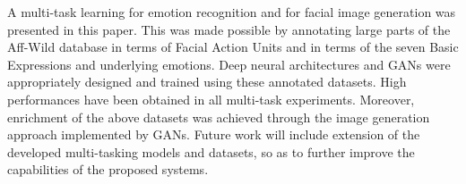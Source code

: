 \documentclass[a4paper, 10pt, conference]{ieeeconf}      %
\begin{document}
A multi-task learning for emotion recognition and for facial image generation was presented in this paper. This was made possible by annotating large parts of the Aff-Wild database in terms of Facial Action Units and in terms of the seven Basic Expressions and underlying emotions. Deep neural architectures and GANs were appropriately designed and trained using these annotated datasets. High performances have been obtained in all multi-task experiments. Moreover, enrichment of the above datasets was achieved through the image generation approach implemented by GANs. Future work will include extension of the developed multi-tasking models and datasets, so as to further improve the capabilities of the proposed systems.        



\end{document}
